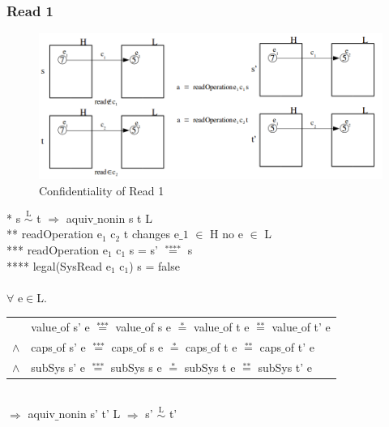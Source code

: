 \documentclass[pdftex,11pt,a4paper]{article}
\begin{document}
\subsubsection{Read 1}\label{sec:Read 1}
\begin{figure}[H]
		\includegraphics[width=1.1\textwidth]{./Pictures/read1Confidentality.png}
		\caption[Confidentiality of Read 1]{Confidentiality of Read 1}
	\label{fig:read1}
\end{figure}	
* s $\overset{\text{L}}{\sim}$ t $\Rightarrow$ aquiv$\_$nonin s t L	\\ 
** readOperation e$_1$ c$_2$ t changes e$\_1$ $\in$ H no e $\in$ L \\
*** readOperation e$_1$ c$_1$ s = s' $\overset{\text{****}}{=}$ s \\
**** legal(SysRead e$_1$ c$_1$) s = false \\ \\
$\forall$ e$\in$L. \\
\begin{tabular}{ll}
& value$\_$of s' e $\overset{\text{***}}{=}$ value$\_$of s e $\overset{\text{*}}{=}$ value$\_$of t e $\overset{\text{**}}{=}$ value$\_$of t' e \\
$\wedge$ & caps$\_$of s' e $\overset{\text{***}}{=}$ caps$\_$of s e $\overset{\text{*}}{=}$ caps$\_$of t e $\overset{\text{**}}{=}$ caps$\_$of t' e \\
$\wedge$ & subSys s' e $\overset{\text{***}}{=}$ subSys s e $\overset{\text{*}}{=}$ subSys t e $\overset{\text{**}}{=}$ subSys t' e
\end{tabular} \\
$\Rightarrow$ aquiv$\_$nonin s' t' L $\Rightarrow$ s' $\overset{\text{L}}{\sim}$ t' 
\end{document}
